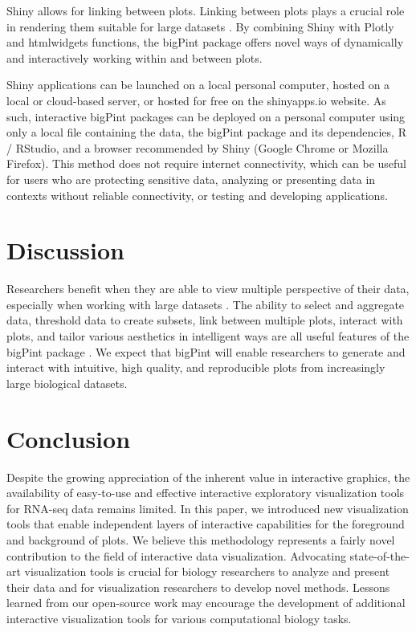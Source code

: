 \documentclass[parskip=full]{bmcart}
\begin{document}
Shiny allows for linking between plots. Linking between plots plays a crucial role in rendering them suitable for large datasets \cite{nguyen2016deep, albuquerque2009quality, heinrich2012parallel}. By combining Shiny with Plotly and htmlwidgets functions, the bigPint package offers novel ways of dynamically and interactively working within and between plots.

Shiny applications can be launched on a local personal computer, hosted on a local or cloud-based server, or hosted for free on the shinyapps.io website. As such, interactive bigPint packages can be deployed on a personal computer using only a local file containing the data, the bigPint package and its dependencies, R / RStudio, and a browser recommended by Shiny (Google Chrome or Mozilla Firefox). This method does not require internet connectivity, which can be useful for users who are protecting sensitive data, analyzing or presenting data in contexts without reliable connectivity, or testing and developing applications.

\section*{Discussion}

Researchers benefit when they are able to view multiple perspective of their data, especially when working with large datasets \cite{swayne2003ggobi, cook2007interactive}. The ability to select and aggregate data, threshold data to create subsets, link between multiple plots, interact with plots, and tailor various aesthetics in intelligent ways are all useful features of the bigPint package \cite{o2010visualizing, pavlopoulos2015visualizing, kerren2007human}. We expect that bigPint will enable researchers to generate and interact with intuitive, high quality, and reproducible plots from increasingly large biological datasets. 

\section*{Conclusion}

Despite the growing appreciation of the inherent value in interactive graphics, the availability of easy-to-use and effective interactive exploratory visualization tools for RNA-seq data remains limited. In this paper, we introduced new visualization tools that enable independent layers of interactive capabilities for the foreground and background of plots. We believe this methodology represents a fairly novel contribution to the field of interactive data visualization. Advocating state-of-the-art visualization tools is crucial for biology researchers to analyze and present their data and for visualization researchers to develop novel methods. Lessons learned from our open-source work may encourage the development of additional interactive visualization tools for various computational biology tasks.
\end{document}
